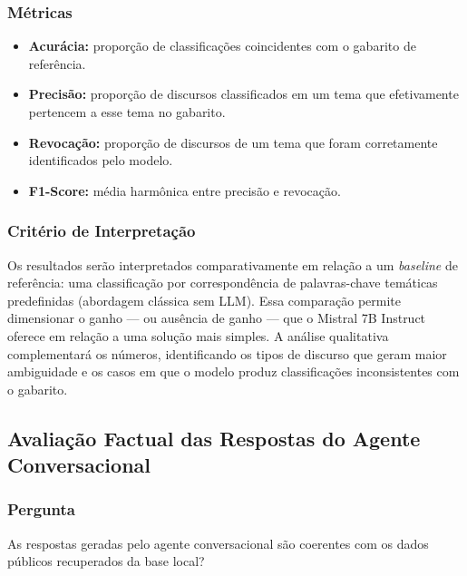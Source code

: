 \subsubsection{Métricas}
\begin{itemize}
    \item \textbf{Acurácia:} proporção de classificações coincidentes com o gabarito de referência.
    \item \textbf{Precisão:} proporção de discursos classificados em um tema que efetivamente pertencem a esse tema no gabarito.
    \item \textbf{Revocação:} proporção de discursos de um tema que foram corretamente identificados pelo modelo.
    \item \textbf{F1-Score:} média harmônica entre precisão e revocação.
\end{itemize}

\subsubsection{Critério de Interpretação}
Os resultados serão interpretados comparativamente em relação a um \textit{baseline} de referência: uma classificação por correspondência de palavras-chave temáticas predefinidas (abordagem clássica sem LLM). Essa comparação permite dimensionar o ganho — ou ausência de ganho — que o Mistral 7B Instruct oferece em relação a uma solução mais simples. A análise qualitativa complementará os números, identificando os tipos de discurso que geram maior ambiguidade e os casos em que o modelo produz classificações inconsistentes com o gabarito.

\subsection{Avaliação Factual das Respostas do Agente Conversacional}

\subsubsection{Pergunta}
As respostas geradas pelo agente conversacional são coerentes com os dados públicos recuperados da base local?

